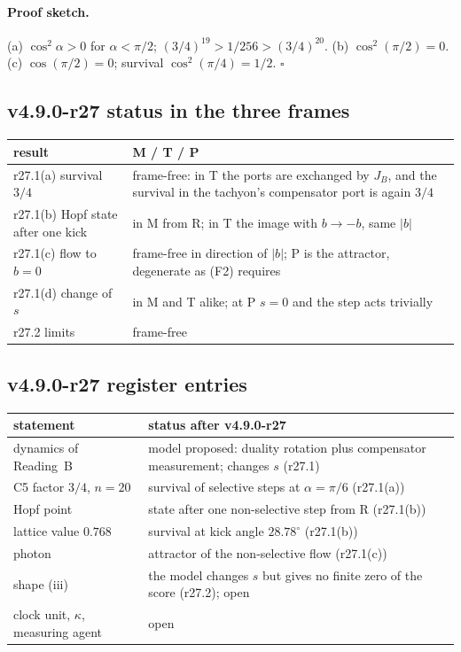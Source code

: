 \paragraph{Proof sketch.}
(a) \(\cos^2\alpha>0\) for \(\alpha<\pi/2\); \((3/4)^{19}>1/256>(3/4)^{20}\).  (b) \(\cos^2(\pi/2)=0\).  (c) \(\cos(\pi/2)=0\);
survival \(\cos^2(\pi/4)=1/2\).  \(\square\)

\subsection*{v4.9.0-r27 status in the three frames}
\label{subsec:v490-r27-frames}

\begin{center}
\small
\begin{tabular}{@{}>{\raggedright\arraybackslash}p{}>{\raggedright\arraybackslash}p{}@{}}
\toprule
result & M / T / P\\
\midrule
r27.1(a) survival \(3/4\) & frame-free: in T the ports are exchanged by \(J_B\), and the survival in the tachyon's compensator port is again \(3/4\)\\
r27.1(b) Hopf state after one kick & in M from R; in T the image with \(b\to-b\), same \(|b|\)\\
r27.1(c) flow to \(b=0\) & frame-free in direction of \(|b|\); P is the attractor, degenerate as (F2) requires\\
r27.1(d) change of \(s\) & in M and T alike; at P \(s=0\) and the step acts trivially\\
r27.2 limits & frame-free\\
\bottomrule
\end{tabular}
\end{center}

\subsection*{v4.9.0-r27 register entries}
\label{subsec:v490-r27-register}

\begin{center}
\small
\begin{tabular}{@{}>{\raggedright\arraybackslash}p{}>{\raggedright\arraybackslash}p{}@{}}
\toprule
statement & status after v4.9.0-r27\\
\midrule
dynamics of Reading~B & model proposed: duality rotation plus compensator measurement; changes \(s\) (r27.1)\\
C5 factor \(3/4\), \(n=20\) & survival of selective steps at \(\alpha=\pi/6\) (r27.1(a))\\
Hopf point & state after one non-selective step from R (r27.1(b))\\
lattice value \(0.768\) & survival at kick angle \(28.78^\circ\) (r27.1(b))\\
photon & attractor of the non-selective flow (r27.1(c))\\
shape (iii) & the model changes \(s\) but gives no finite zero of the score (r27.2); open\\
clock unit, \(\kappa\), measuring agent & open\\
\bottomrule
\end{tabular}
\end{center}

